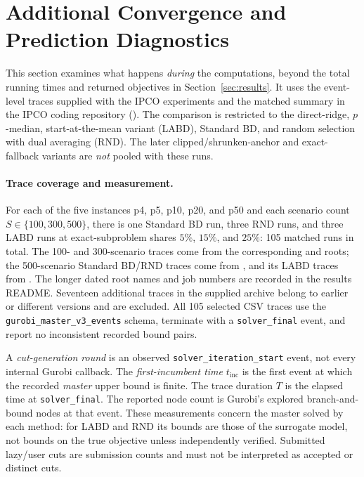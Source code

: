 \section{Additional Convergence and Prediction Diagnostics}\label{app:trace-audit}

This section examines what happens \emph{during} the computations, beyond the total running times and returned objectives in Section~\ref{sec:results}. It uses the event-level traces supplied with the IPCO experiments and the matched summary in the IPCO coding repository (). The comparison is restricted to the direct-ridge, $p$-median, start-at-the-mean variant  (LABD), Standard BD, and random selection with dual averaging (RND). The later clipped/shrunken-anchor and exact-fallback variants are \emph{not} pooled with these runs.

\paragraph{Trace coverage and measurement.}
For each of the five instances p4, p5, p10, p20, and p50 and each scenario count $S\in\{100,300,500\}$, there is one Standard BD run, three RND runs, and three LABD runs at exact-subproblem shares $5\%$, $15\%$, and $25\%$: 105 matched runs in total. The 100- and 300-scenario traces come from the corresponding  and  roots; the 500-scenario Standard BD/RND traces come from , and its LABD traces from . The longer dated root names and job numbers are recorded in the results README. Seventeen additional traces in the supplied archive belong to earlier or different versions and are excluded. All 105 selected CSV traces use the \texttt{gurobi\_master\_v3\_events} schema, terminate with a \texttt{solver\_final} event, and report no inconsistent recorded bound pairs.

A \emph{cut-generation round} is an observed \texttt{solver\_iteration\_start} event, not every internal Gurobi callback. The \emph{first-incumbent time} $t_{\mathrm{inc}}$ is the first event at which the recorded \emph{master} upper bound is finite. The trace duration $T$ is the elapsed time at \texttt{solver\_final}. The reported node count is Gurobi's explored branch-and-bound nodes at that event. These measurements concern the master solved by each method: for LABD and RND its bounds are those of the surrogate model, not bounds on the true objective unless independently verified. Submitted lazy/user cuts are submission counts and must not be interpreted as accepted or distinct cuts.

